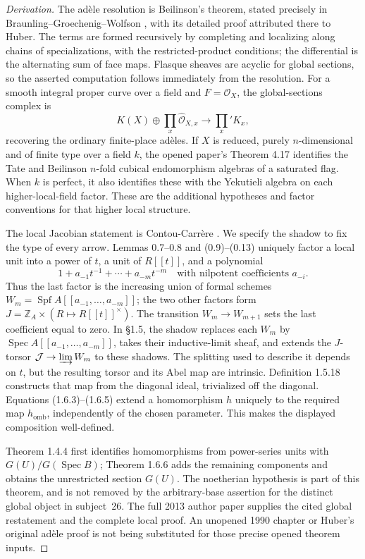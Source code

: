\begin{proof}[Derivation]
The ad\`ele resolution is Beilinson's theorem, stated precisely in Braunling--Groechenig--Wolfson \cite[Theorem 2.1]{BBGW2016}, with its detailed proof attributed there to Huber. The terms are formed recursively by completing and localizing along chains of specializations, with the restricted-product conditions; the differential is the alternating sum of face maps. Flasque sheaves are acyclic for global sections, so the asserted computation follows immediately from the resolution. For a smooth integral proper curve over a field and $F=\mathcal O_X$, the global-sections complex is
\[
 K(X)\oplus\prod_x\widehat{\mathcal O}_{X,x}
 \longrightarrow\prod_x'K_x,
\]
recovering the ordinary finite-place ad\`eles. If $X$ is reduced, purely $n$-dimensional and of finite type over a field $k$, the opened paper's Theorem 4.17 identifies the Tate and Beilinson $n$-fold cubical endomorphism algebras of a saturated flag. When $k$ is perfect, it also identifies these with the Yekutieli algebra on each higher-local-field factor. These are the additional hypotheses and factor conventions for that higher local structure.

The local Jacobian statement is Contou-Carr\`ere \cite[Theorems 1.4.4 and 1.6.6]{BContouCarrere2013}. We specify the shadow to fix the type of every arrow. Lemmas 0.7--0.8 and (0.9)--(0.13) uniquely factor a local unit into a power of $t$, a unit of $R[[t]]$, and a polynomial
\[
 1+a_{-1}t^{-1}+\cdots+a_{-m}t^{-m}
 \quad\text{with nilpotent coefficients }a_{-i}.
\]
Thus the last factor is the increasing union of formal schemes
$W_m=\operatorname{Spf}A[[a_{-1},\ldots,a_{-m}]]$; the two other factors form $J=\mathbb Z_A\times(R\mapsto R[[t]]^\times)$. The transition $W_m\to W_{m+1}$ sets the last coefficient equal to zero. In \S1.5, the shadow replaces each $W_m$ by $\operatorname{Spec}A[[a_{-1},\ldots,a_{-m}]]$, takes their inductive-limit sheaf, and extends the $J$-torsor $\mathcal J\to\varinjlim W_m$ to these shadows. The splitting used to describe it depends on $t$, but the resulting torsor and its Abel map are intrinsic. Definition 1.5.18 constructs that map from the diagonal ideal, trivialized off the diagonal. Equations (1.6.3)--(1.6.5) extend a homomorphism $h$ uniquely to the required map $h_{\mathrm{omb}}$, independently of the chosen parameter. This makes the displayed composition well-defined.

Theorem 1.4.4 first identifies homomorphisms from power-series units with $G(U)/G(\operatorname{Spec}B)$; Theorem 1.6.6 adds the remaining components and obtains the unrestricted section $G(U)$. The noetherian hypothesis is part of this theorem, and is not removed by the arbitrary-base assertion for the distinct global object in subject~26. The full 2013 author paper supplies the cited global restatement and the complete local proof. An unopened 1990 chapter or Huber's original ad\`ele proof is not being substituted for those precise opened theorem inputs.
\end{proof}

